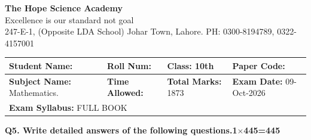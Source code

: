 \documentclass[11pt,a4paper]{article}
\begin{document}
\begin{center}
  {\Huge\bfseries The Hope Science Academy}\\[3pt]
  {\small Excellence is our standard not goal}\\[2pt]
  {\small 247-E-1, (Opposite LDA School) Johar Town, Lahore. PH: 0300-8194789, 0322-4157001}
\end{center}
\medskip\noindent
\begin{tabularx}{\linewidth}{|X|X|X|X|}
\hline
\textbf{Student Name:} & \textbf{Roll Num:} & \textbf{Class:} 10th & \textbf{Paper Code:} \\ \hline
\textbf{Subject Name:} Mathematics. & \textbf{Time Allowed:} & \textbf{Total Marks:} 1873 & \textbf{Exam Date:} 09-Oct-2026 \\ \hline
\multicolumn{4}{|l|}{\textbf{Exam Syllabus:} FULL BOOK} \\ \hline
\end{tabularx}
\bigskip
\noindent\textbf{Q5. Write detailed answers of the following questions.}\hfill\textbf{1$\times$445=445}
\end{document}

